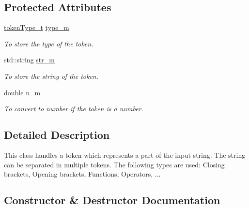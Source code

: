 \subsection*{Protected Attributes}
\begin{DoxyCompactItemize}
\item 
\hypertarget{class_token_a01979ac699ac624615570cf0ea1e5b71}{}\hyperlink{class_token_af5797fcd4cb63823f3108625cbb83d11}{token\+Type\+\_\+t} \hyperlink{class_token_a01979ac699ac624615570cf0ea1e5b71}{type\+\_\+m}\label{class_token_a01979ac699ac624615570cf0ea1e5b71}

\begin{DoxyCompactList}\small\item\em To store the type of the token. \end{DoxyCompactList}\item 
\hypertarget{class_token_a2781f7d67fae2fa1cbfe4af5caf8473d}{}std\+::string \hyperlink{class_token_a2781f7d67fae2fa1cbfe4af5caf8473d}{str\+\_\+m}\label{class_token_a2781f7d67fae2fa1cbfe4af5caf8473d}

\begin{DoxyCompactList}\small\item\em To store the string of the token. \end{DoxyCompactList}\item 
\hypertarget{class_token_ab5e62028b935156e5f69f3a50b20c078}{}double \hyperlink{class_token_ab5e62028b935156e5f69f3a50b20c078}{n\+\_\+m}\label{class_token_ab5e62028b935156e5f69f3a50b20c078}

\begin{DoxyCompactList}\small\item\em To convert to number if the token is a number. \end{DoxyCompactList}\end{DoxyCompactItemize}


\subsection{Detailed Description}
This class handles a token which represents a part of the input string. The string can be separated in multiple tokens. The following types are used\+: Closing brackets, Opening brackets, Functions, Operators, ... 

\subsection{Constructor \& Destructor Documentation}
\hypertarget{class_token_a873561c98ca3fb50206e588b53ea2a35}{}
